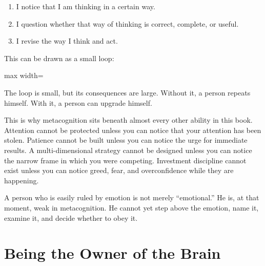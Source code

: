 \begin{enumerate}
\item I notice that I am thinking in a certain way.
\item I question whether that way of thinking is correct, complete, or useful.
\item I revise the way I think and act.
\end{enumerate}

This can be drawn as a small loop:

\begin{center}
\begin{adjustbox}{max width=\linewidth}
\end{adjustbox}
\end{center}

The loop is small, but its consequences are large. Without it, a person repeats himself. With it, a person can upgrade himself.

This is why metacognition sits beneath almost every other ability in this book. Attention cannot be protected unless you can notice that your attention has been stolen. Patience cannot be built unless you can notice the urge for immediate results. A multi-dimensional strategy cannot be designed unless you can notice the narrow frame in which you were competing. Investment discipline cannot exist unless you can notice greed, fear, and overconfidence while they are happening.

A person who is easily ruled by emotion is not merely ``emotional.'' He is, at that moment, weak in metacognition. He cannot yet step above the emotion, name it, examine it, and decide whether to obey it.

\section*{Being the Owner of the Brain}

